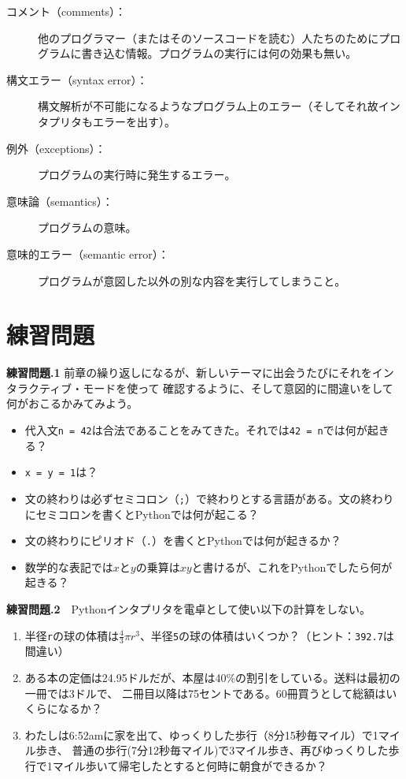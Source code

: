 \documentclass[a4j,12pt,makeidx]{jbook}
\newcommand{\tp}{\thechapter}
\begin{document}
{\begin{description}
\item[コメント（comments）：]他のプログラマー（またはそのソースコードを読む）人たちのためにプログラムに書き込む情報。プログラムの実行には何の効果も無い。  

\item[構文エラー（syntax error）：]構文解析が不可能になるようなプログラム上のエラー（そしてそれ故インタプリタもエラーを出す）。

\item[例外（exceptions）：]プログラムの実行時に発生するエラー。

\item[意味論（semantics）：]プログラムの意味。

\item[意味的エラー（semantic error）：]プログラムが意図した以外の別な内容を実行してしまうこと。
\end{description}
%
\section{練習問題}
\noindent
{\bf 練習問題\tp.1} 前章の繰り返しになるが、新しいテーマに出会うたびにそれをインタラクティブ・モードを使って
確認するように、そして意図的に間違いをして何がおこるかみてみよう。
\begin{itemize}
\item 代入文{\tt n = 42}は合法であることをみてきた。それでは{\tt 42 = n}では何が起きる？
\item {\tt x = y = 1}は？
\item 文の終わりは必ずセミコロン（{\tt ;}）で終わりとする言語がある。文の終わりにセミコロンを書くとPythonでは何が起こる？
\item 文の終わりにピリオド（{\tt .}）を書くとPythonでは何が起きるか？
\item 数学的な表記では$x$と$y$の乗算は$xy$と書けるが、これをPythonでしたら何が起きる？
\end{itemize} \par

\noindent
{\bf 練習問題\tp.2}　Pythonインタプリタを電卓として使い以下の計算をしない。\\
\begin{enumerate}
\item 半径{\tt r}の球の体積は$\frac{4}{3} \pi r^3$、半径{\tt 5}の球の体積はいくつか？（ヒント：{\tt 392.7}は間違い）
\item ある本の定価は24.95ドルだが、本屋は40{\%}の割引をしている。送料は最初の一冊では3ドルで、
二冊目以降は75セントである。60冊買うとして総額はいくらになるか？
\item わたしは6:52amに家を出て、ゆっくりした歩行（8分15秒毎マイル）で1マイル歩き、
普通の歩行(7分12秒毎マイル)で3マイル歩き、再びゆっくりした歩行で1マイル歩いて帰宅したとすると何時に朝食ができるか？
\end{enumerate}
%
}
\end{document}
